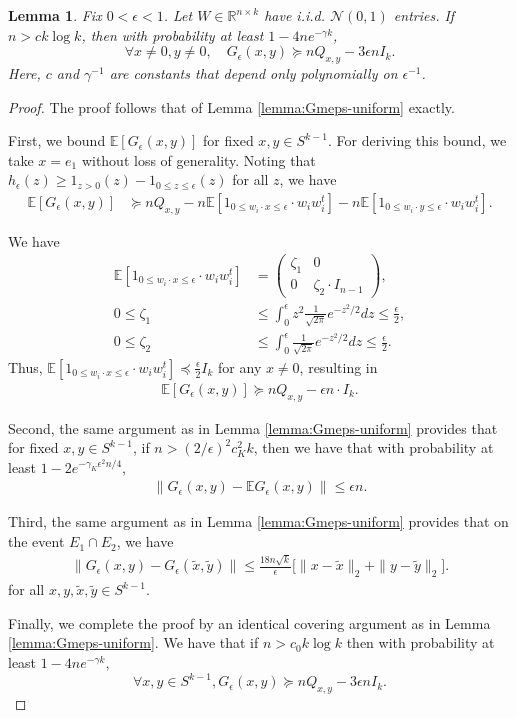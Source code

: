 \documentclass[11pt]{article}
\newtheorem{lemma}[theorem]{Lemma}
\newcommand{\R}{\mathbb{R}}
\newcommand{\eps}{\epsilon}
\newcommand{\xtilde}{\tilde{x}}
\newcommand{\spherek}{S^{k-1}}
\newcommand{\calN}{\mathcal{N}}
\newcommand{\tran}{t}
\newcommand{\wi}{w_i}
\newcommand{\wix}{w_i \cdot x}
\newcommand{\wiy}{w_i \cdot y}
\newcommand{\wit}{w_i^\tran}
\newcommand{\heps}{h_{\eps}}
\newcommand{\Geps}{G_{\eps}}
\newcommand{\matrixleq}{\preceq}
\newcommand{\matrixgeq}{\succeq}
\newcommand{\E}{\mathbb{E}}
\newcommand{\ytilde}{\tilde{y}}
\newcommand{\Qxy}{Q_{x,y}}
\begin{document}
\begin{lemma} \label{lemma:Geps-uniform} 
Fix $0 < \eps < 1$.  Let $W \in \R^{n \times k}$ have i.i.d. $\calN(0,1)$ entries.   If $n > c k \log k$, then with probability at least $1- 4 n e^{-\gamma k}$,
\[
\forall x\neq 0, y \neq 0, \quad \Geps(x,y) \matrixgeq n \Qxy - 3 \eps n I_k.
\]
Here, $c$ and $\gamma^{-1}$ are constants that depend only polynomially on $\eps^{-1}$.
\end{lemma} 
\begin{proof}
The proof follows that of Lemma \ref{lemma:Gmeps-uniform} exactly. 

First, we bound $\E[\Geps(x,y)]$ for fixed $x,y \in \spherek$.  For deriving this bound, we take $x = e_1$ without loss of generality. Noting that $\heps(z) \geq 1_{z>0}(z) -  1_{0\leq z \leq \eps}(z)$ for all $z$, we have
\begin{align*}
\E[ \Geps(x,y) ] &\matrixgeq   n\Qxy -   n\E[ 1_{0\leq \wix \leq \eps} \cdot \wi \wit ] -   n \E[ 1_{0\leq \wiy \leq \eps} \cdot \wi \wit ].
\end{align*}


 We have  
\begin{align*}
\E[ 1_{0\leq \wix \leq \eps} \cdot \wi \wit  ] &= \begin{pmatrix}\zeta_1 & 0 \\ 0 & \zeta_2 \cdot I_{n-1} \end{pmatrix}, \\
0 \leq \zeta_1 &\leq \int_{0}^\eps z^2 \frac{1}{\sqrt{2 \pi}} e^{-z^2/2} dz \leq \frac{\eps}{2},\\
0 \leq \zeta_2 &\leq \int_{0}^\eps  \frac{1}{\sqrt{2 \pi}} e^{-z^2/2} dz \leq \frac{\eps}{2}.
\end{align*}
Thus, $\E[ 1_{0\leq \wix \leq \eps} \cdot \wi \wit ] \matrixleq \frac{\eps}{2} I_k$ for any $x \neq 0$, resulting in
\begin{align*}
\E[\Geps(x,y)] \matrixgeq n \Qxy - \eps n \cdot I_k. 
\end{align*}


Second, the same argument as in Lemma \ref{lemma:Gmeps-uniform} provides that for fixed $x,y\in \spherek$, 
if $n > (2/\eps)^2 c_K^2 k$, then we have that with probability at least $1-2e^{-\gamma_K \eps^2 n/4}$, 
\begin{align*}
\| \Geps(x,y) - \E \Geps(x,y) \| \leq \eps n.   
\end{align*}

Third, the same argument as in Lemma \ref{lemma:Gmeps-uniform} provides that on the event $E_1\cap E_2$, we have
\begin{align*}
\| \Geps(x,y) - \Geps(\xtilde, \ytilde) \| \leq \frac{18 n\sqrt{k}}{\eps} \bigl[ \|x-\xtilde \|_2 + \|y - \ytilde\|_2 \bigr].   
\end{align*}
for all $x,y,\xtilde, \ytilde \in \spherek$. 


Finally, we complete the proof by an identical covering argument as in Lemma \ref{lemma:Gmeps-uniform}.  We have that if $n > c_0 k \log k$ then with probability at least $1 - 4 n e^{-\gamma k}$, 
\[
\forall x, y \in \spherek, \Geps(x,y) \matrixgeq n \Qxy   - 3 \eps n I_k.
\]
\end{proof}
\end{document}
